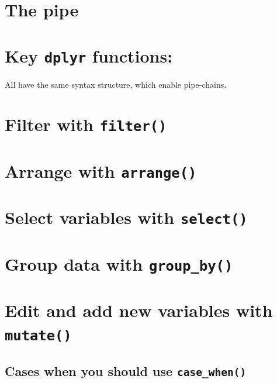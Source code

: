 \documentclass[]{book}
\begin{document}
\hypertarget{the-pipe}{%
\section{The pipe}\label{the-pipe}}

\hypertarget{key-dplyr-functions}{%
\section{\texorpdfstring{Key \texttt{dplyr} functions:}{Key dplyr functions:}}\label{key-dplyr-functions}}

All have the same syntax structure, which enable pipe-chains.

\hypertarget{filter-with-filter}{%
\section{\texorpdfstring{Filter with \texttt{filter()}}{Filter with filter()}}\label{filter-with-filter}}

\hypertarget{arrange-with-arrange}{%
\section{\texorpdfstring{Arrange with \texttt{arrange()}}{Arrange with arrange()}}\label{arrange-with-arrange}}

\hypertarget{select-variables-with-select}{%
\section{\texorpdfstring{Select variables with \texttt{select()}}{Select variables with select()}}\label{select-variables-with-select}}

\hypertarget{group-data-with-group_by}{%
\section{\texorpdfstring{Group data with \texttt{group\_by()}}{Group data with group\_by()}}\label{group-data-with-group_by}}

\hypertarget{edit-and-add-new-variables-with-mutate}{%
\section{\texorpdfstring{Edit and add new variables with \texttt{mutate()}}{Edit and add new variables with mutate()}}\label{edit-and-add-new-variables-with-mutate}}

\hypertarget{cases-when-you-should-use-case_when}{%
\subsection{\texorpdfstring{Cases when you should use \texttt{case\_when()}}{Cases when you should use case\_when()}}\label{cases-when-you-should-use-case_when}}
\end{document}
